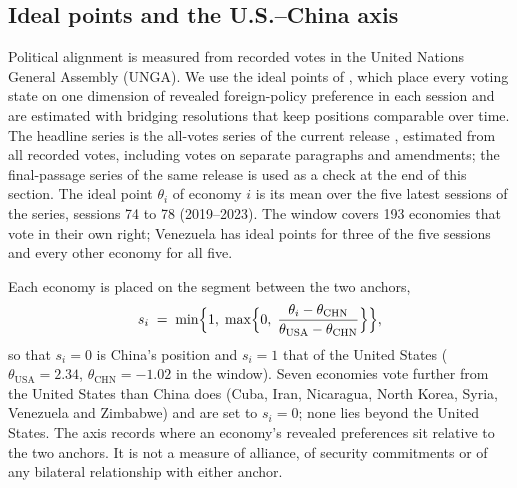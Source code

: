 
\subsection{Ideal points and the U.S.--China axis}\label{subsec:coalition_axis}

Political alignment is measured from recorded votes in the United Nations General Assembly
(UNGA). We use the ideal points of \citet{bailey2017estimating}, which place every voting state
on one dimension of revealed foreign-policy preference in each session and are estimated with
bridging resolutions that keep positions comparable over time. The headline series is the
all-votes series of the current release \citep[Harvard Dataverse, V39.0, July 2026;][]{voeten2009unga},
estimated from all recorded votes, including votes on separate paragraphs and amendments; the
final-passage series of the same release is used as a check at the end of this section. The
ideal point $\theta_i$ of economy $i$ is its mean over the five latest sessions of the series,
sessions 74 to 78 (2019--2023). The window covers 193 economies that vote in their own right;
Venezuela has ideal points for three of the five sessions and every other economy for all five.

Each economy is placed on the segment between the two anchors,
\begin{equation}\label{eq:coalition_axis}
  s_i \;=\; \min\Bigl\{1,\;\max\Bigl\{0,\;
  \frac{\theta_i-\theta_{\mathrm{CHN}}}{\theta_{\mathrm{USA}}-\theta_{\mathrm{CHN}}}\Bigr\}\Bigr\},
\end{equation}
so that $s_i=0$ is China's position and $s_i=1$ that of the United States
($\theta_{\mathrm{USA}}=2.34$, $\theta_{\mathrm{CHN}}=-1.02$ in the window). Seven economies vote
further from the United States than China does (Cuba, Iran, Nicaragua, North Korea, Syria,
Venezuela and Zimbabwe) and are set to $s_i=0$; none lies beyond the United States. The axis
records where an economy's revealed preferences sit relative to the two anchors. It is not a
measure of alliance, of security commitments or of any bilateral relationship with either anchor.

